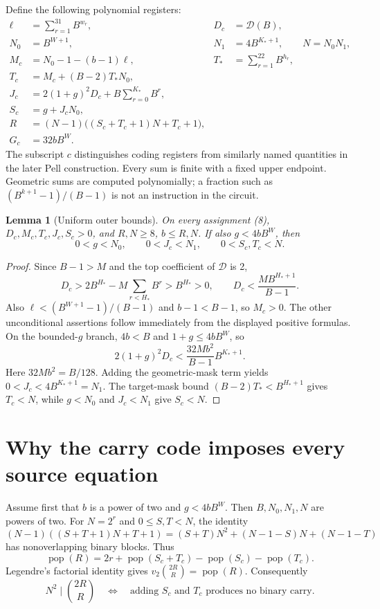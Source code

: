 \documentclass[11pt]{article}
\newtheorem{lemma}[theorem]{Lemma}
\theoremstyle{definition}\newtheorem{definition}[theorem]{Definition}
\newcommand{\pop}{\operatorname{pop}}
\begin{document}
Define the following polynomial registers:
\begin{align*}
 \ell&=\sum_{r=1}^{31}B^{w_r}, & D_c&=\mathcal D(B),\\
 N_0&=B^{W+1}, &N_1&=4B^{K_*+1},\qquad N=N_0N_1,\\
 M_c&=N_0-1-(b-1)\ell, &T_*&=\sum_{r=1}^{22}B^{h_r},\\
 T_c&=M_c+(B-2)T_*N_0,\\
 J_c&=2(1+g)^2D_c+B\sum_{r=0}^{K_*}B^r,\\
 S_c&=g+J_cN_0,\\
 R&=(N-1)\bigl((S_c+T_c+1)N+T_c+1\bigr),\\
 G_c&=32bB^W.
\end{align*}
The subscript $c$ distinguishes coding registers from similarly named
quantities in the later Pell construction. Every sum is finite with a
fixed upper endpoint. Geometric sums are computed polynomially; a
fraction such as $(B^{k+1}-1)/(B-1)$ is not an instruction in the circuit.

\begin{lemma}[Uniform outer bounds]
On every assignment (8), $D_c,M_c,T_c,J_c,S_c>0$, and
$R,N\geq8$, $b\leq R,N$. If also $g<4bB^W$, then
\[
 0<g<N_0,\qquad0<J_c<N_1,\qquad0<S_c,T_c<N.
 \tag{10}\label{eq:outer}
\]
\end{lemma}
\begin{proof}
Since $B-1>M$ and the top coefficient of $\mathcal D$ is 2,
\[
 D_c>2B^{H_*}-M\sum_{r<H_*}B^r>B^{H_*}>0,
 \qquad D_c<\frac{MB^{H_*+1}}{B-1}.
\]
Also $\ell<(B^{W+1}-1)/(B-1)$ and $b-1<B-1$, so $M_c>0$.
The other unconditional assertions follow immediately from the displayed
positive formulas. On the bounded-$g$ branch, $4b<B$ and
$1+g\leq4bB^W$, so
\[
 2(1+g)^2D_c<\frac{32Mb^2}{B-1}B^{K_*+1}.
\]
Here $32Mb^2=B/128$. Adding the geometric-mask term yields
$0<J_c<4B^{K_*+1}=N_1$. The target-mask bound
$(B-2)T_*<B^{H_*+1}$ gives $T_c<N$, while $g<N_0$ and
$J_c<N_1$ give $S_c<N$.
\end{proof}

\section{Why the carry code imposes every source equation}
\label{sec:carry}

Assume first that $b$ is a power of two and $g<4bB^W$.
Then $B,N_0,N_1,N$ are powers of two. For $N=2^r$ and
$0\leq S,T<N$, the identity
\[
 (N-1)((S+T+1)N+T+1)
 =(S+T)N^2+(N-1-S)N+(N-1-T)
 \tag{11}
\]
has nonoverlapping binary blocks. Thus
\[
 \pop(R)=2r+\pop(S_c+T_c)-\pop(S_c)-\pop(T_c).
\]
Legendre's factorial identity gives
$v_2\binom{2R}{R}=\pop(R)$. Consequently
\[
 N^2\mid\binom{2R}{R}\quad\Longleftrightarrow\quad
 \text{adding $S_c$ and $T_c$ produces no binary carry}.
 \tag{12}
\]
\end{document}
